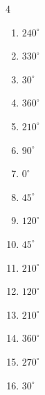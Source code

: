 \begin{multicols}{4}
\begin{enumerate}
  \item $\displaystyle 240^{\circ}$

  \item $\displaystyle 330^{\circ}$

  \item $\displaystyle 30^{\circ}$

  \item $\displaystyle 360^{\circ}$
        \phantom{$\displaystyle =2\pi$}

  \item $\displaystyle 210^{\circ}$

  \item $\displaystyle 90^{\circ}$

  \item $\displaystyle 0^{\circ}$
        \phantom{$\displaystyle =0$}

  \item $\displaystyle 45^{\circ}$

  \item $\displaystyle 120^{\circ}$

  \item $\displaystyle 45^{\circ}$

  \item $\displaystyle 210^{\circ}$

  \item $\displaystyle 120^{\circ}$

  \item $\displaystyle 210^{\circ}$

  \item $\displaystyle 360^{\circ}$
        \phantom{$\displaystyle =2\pi$}

  \item $\displaystyle 270^{\circ}$

  \item $\displaystyle 30^{\circ}$


\end{enumerate}
\end{multicols}
